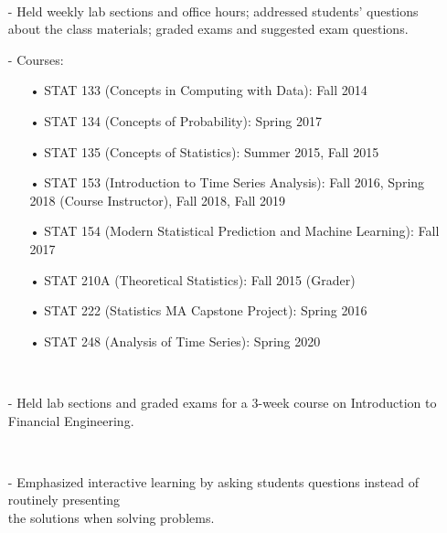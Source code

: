 \documentclass{res}
\begin{document}
\begin{resume}
      \\ 
            \begin{itemize}\setlength\itemsep{0em}
        \item[-] Held weekly lab sections and office hours; addressed students' questions about the class materials; graded exams and suggested exam questions. 
        \item[-] Courses: 
        \begin{itemize}\setlength\itemsep{0em}
        \item[•] STAT 133 (Concepts in Computing with Data): Fall 2014
        \item[•] STAT 134 (Concepts of Probability): Spring 2017
        \item[•] STAT 135 (Concepts of Statistics): Summer 2015, Fall 2015
        \item[•] STAT 153 (Introduction to Time Series Analysis): Fall 2016, Spring 2018 (Course Instructor), Fall 2018, Fall 2019
        \item[•] STAT 154 (Modern Statistical Prediction and Machine Learning): Fall 2017
        \item[•] STAT 210A (Theoretical Statistics): Fall 2015 (Grader)
        \item[•]  STAT 222 (Statistics MA Capstone Project): Spring 2016
         \item[•] STAT 248 (Analysis of Time Series): Spring 2020
        \end{itemize}
          \end{itemize}

      \\ 
        \begin{itemize}\setlength\itemsep{0em}
        \item[-] Held lab sections and graded exams for a 3-week course on Introduction to Financial Engineering.
        \end{itemize}
    
     \\ 
    \begin{itemize}
     \item[-] Emphasized interactive learning by asking students questions instead of routinely presenting\\ 
     the solutions when solving problems.        
    \end{itemize}


\end{resume}
\end{document}
